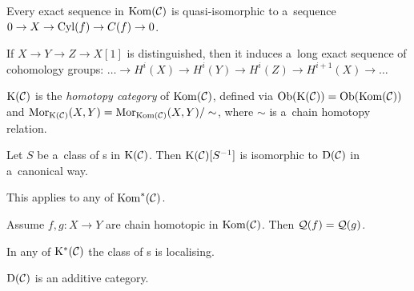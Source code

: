 	\begin{fact}
		Every exact sequence in $\mathrm{Kom}(\mathcal{C})$ is quasi-isomorphic 
		to a~sequence $0 \to X \to \mathrm{Cyl}(f) \to C(f) \to 0$.
	\end{fact}
	
	\begin{fact}
		If $X \to Y \to Z \to X[1]$ is distinguished, then
		it induces a~long exact sequence of cohomology groups:
		$\ldots \to H^i(X) \to H^i(Y) \to H^i(Z) \to H^{i+1}(X) \to \ldots$
	\end{fact}
	
	\begin{definition}
		$\mathrm{K}(\mathcal{C})$ is the \emph{homotopy category} of $\mathrm{Kom}(\mathcal{C})$, defined via
		$\mathrm{Ob}(\mathrm{K}(\mathcal{C})) = \mathrm{Ob}(\mathrm{Kom}(\mathcal{C}))$ and $\mathrm{Mor}_{\mathrm{K}(\mathcal{C})}(X,Y)
		= \mathrm{Mor}_{\mathrm{Kom}(\mathcal{C})}(X,Y)/\sim$,
		where $\sim$ is a~chain homotopy relation.
	\end{definition}
	
	\begin{theorem}
		Let $S$ be a~class of {\qi}s in $\mathrm{K}(\mathcal{C})$. 
		Then $\mathrm{K}(\mathcal{C})[S^{-1}]$ is isomorphic to ${\mathrm{D}({\mathcal{C}})}$ in a~canonical way.
		
		This applies to any of $\mathrm{Kom}^{\ast}(\mathcal{C})$.
	\end{theorem}
	
	\begin{lemma}
		Assume $f, g: X \to Y$ are chain homotopic in $\mathrm{Kom}(\mathcal{C})$.
		Then $\mathcal{Q}(f) = \mathcal{Q}(g)$.
	\end{lemma}
	
	\begin{theorem}
		In any of $\mathrm{K}^\ast(\mathcal{C})$ the class of {\qi}s is localising.
	\end{theorem}
	
	\begin{theorem}
		${\mathrm{D}({\mathcal{C}})}$ is an additive category.
	\end{theorem}

















 
 
